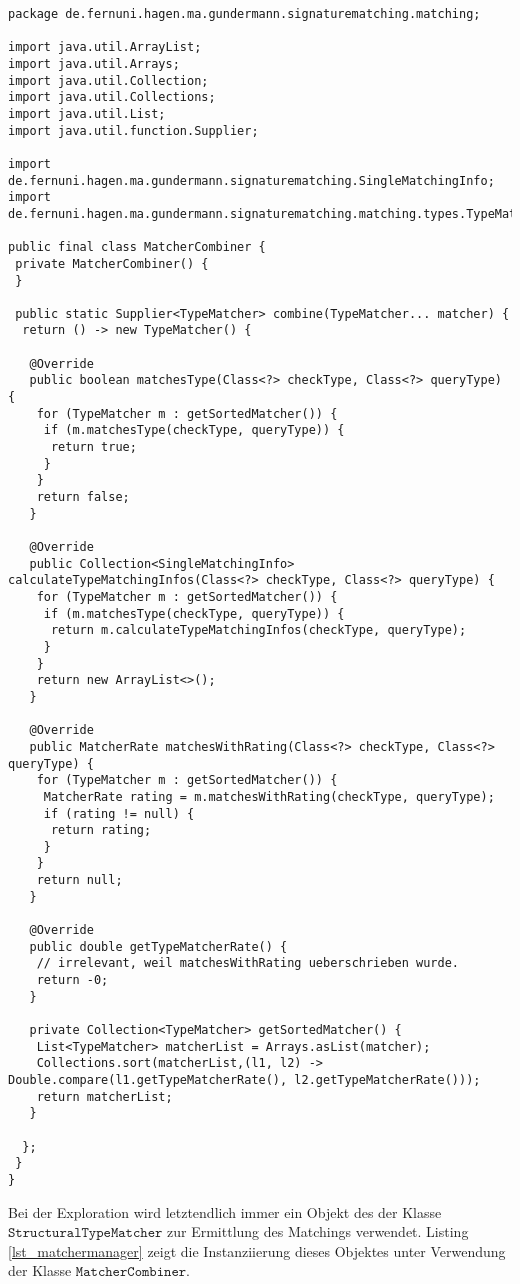 \begin{lstlisting}[style = java, caption = Klasse: MatcherCombiner, captionpos = b, label = lst_matchercombiner]
package de.fernuni.hagen.ma.gundermann.signaturematching.matching;

import java.util.ArrayList;
import java.util.Arrays;
import java.util.Collection;
import java.util.Collections;
import java.util.List;
import java.util.function.Supplier;

import de.fernuni.hagen.ma.gundermann.signaturematching.SingleMatchingInfo;
import de.fernuni.hagen.ma.gundermann.signaturematching.matching.types.TypeMatcher;

public final class MatcherCombiner {
 private MatcherCombiner() {
 }

 public static Supplier<TypeMatcher> combine(TypeMatcher... matcher) {
  return () -> new TypeMatcher() {

   @Override
   public boolean matchesType(Class<?> checkType, Class<?> queryType) {
	for (TypeMatcher m : getSortedMatcher()) {
	 if (m.matchesType(checkType, queryType)) {
	  return true;
	 }
	}
	return false;
   }

   @Override
   public Collection<SingleMatchingInfo> calculateTypeMatchingInfos(Class<?> checkType, Class<?> queryType) {
	for (TypeMatcher m : getSortedMatcher()) {
	 if (m.matchesType(checkType, queryType)) {
	  return m.calculateTypeMatchingInfos(checkType, queryType);
	 }
	}
	return new ArrayList<>();
   }

   @Override
   public MatcherRate matchesWithRating(Class<?> checkType, Class<?> queryType) {
	for (TypeMatcher m : getSortedMatcher()) {
	 MatcherRate rating = m.matchesWithRating(checkType, queryType);
	 if (rating != null) {
	  return rating;
	 }
	}
	return null;
   }

   @Override
   public double getTypeMatcherRate() {
	// irrelevant, weil matchesWithRating ueberschrieben wurde.
	return -0;
   }

   private Collection<TypeMatcher> getSortedMatcher() {
	List<TypeMatcher> matcherList = Arrays.asList(matcher);
	Collections.sort(matcherList,(l1, l2) -> Double.compare(l1.getTypeMatcherRate(), l2.getTypeMatcherRate()));
	return matcherList;
   }

  };
 }
}
\end{lstlisting}
\noindent
Bei der Exploration wird letztendlich immer ein Objekt des der Klasse $\texttt{StructuralTypeMatcher}$ zur Ermittlung des Matchings verwendet. Listing \ref{lst_matchermanager} zeigt die Instanziierung dieses Objektes unter Verwendung der Klasse $\texttt{MatcherCombiner}$.
